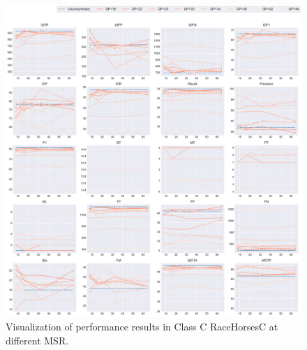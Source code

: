\begin{figure}[!htbp]
\centering
\includegraphics[width=1.0\linewidth]{img/appendix/RaceHorsesC_all_multiplots_msr.pdf}
\caption[Visualization of performance results in Class C RaceHorsesC at different MSR]
{Visualization of performance results in Class C RaceHorsesC at different MSR.}
\label{fig:RaceHorsesC_all_msr}
\end{figure}



